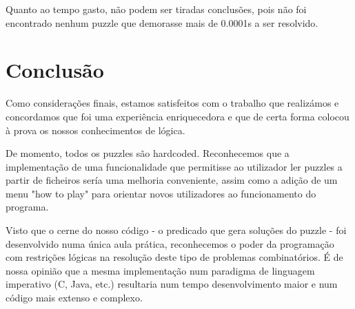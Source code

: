 \documentclass[runningheads,a4paper,12pt]{llncs}
\begin{document}
Quanto ao tempo gasto, não podem ser tiradas conclusões, pois não foi encontrado nenhum puzzle que demorasse mais de 0.0001s a ser resolvido.



\section{Conclusão}

Como considerações finais, estamos satisfeitos com o trabalho que realizámos e concordamos que foi uma experiência enriquecedora e que de certa forma colocou à prova os nossos conhecimentos de lógica.

De momento, todos os puzzles são hardcoded. Reconhecemos que a implementação de uma funcionalidade que permitisse ao utilizador ler puzzles a partir de ficheiros sería uma melhoria conveniente, assim como a adição de um menu "how to play" para orientar novos utilizadores ao funcionamento do programa.

Visto que o cerne do nosso código - o predicado que gera soluções do puzzle - foi desenvolvido numa única aula prática, reconhecemos o poder da programação com restrições lógicas na resolução deste tipo de problemas combinatórios. É de nossa opinião que a mesma implementação num paradigma de linguagem imperativo (C, Java, etc.) resultaria num tempo desenvolvimento maior e num código mais extenso e complexo.
\end{document}
